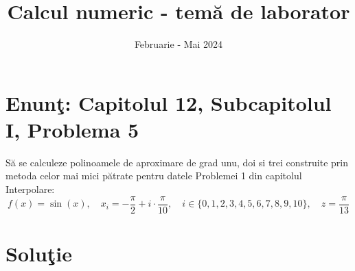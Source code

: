 \documentclass{article}
\begin{document}
\title{Calcul numeric - tem\u{a} de laborator}

\author{}

\date{Februarie - Mai 2024}

\maketitle              %








\section*{Enun\c{t}: Capitolul 12, Subcapitolul I, Problema 5}

S\u{a} se calculeze polinoamele de aproximare de grad unu, doi si trei construite prin metoda celor mai mici pătrate pentru datele Problemei 1 din capitolul
Interpolare:
\[
f(x) = \sin(x),
\quad x_i = -\frac{\pi}{2} + i \cdot \frac{\pi}{10},
\quad i \in \{0, 1, 2, 3, 4, 5, 6, 7, 8, 9, 10\},
\quad z = \frac{\pi}{13}
\] 

\section*{Solu\c{t}ie}
\end{document}
